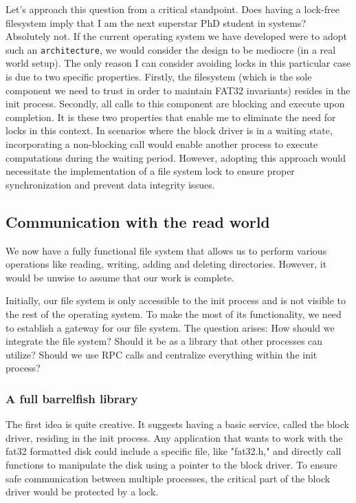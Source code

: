 {Let's approach this question from a critical standpoint. Does having a lock-free filesystem imply that I am the next superstar PhD student in systems? Absolutely not. If the current operating system we have developed were to adopt such an \texttt{architecture}, we would consider the design to be mediocre (in a real world setup). The only reason I can consider avoiding locks in this particular case is due to two specific properties. Firstly, the filesystem (which is the sole component we need to trust in order to maintain FAT32 invariants) resides in the init process. Secondly, all calls to this component are blocking and execute upon completion. It is these two properties that enable me to eliminate the need for locks in this context. In scenarios where the block driver is in a waiting state, incorporating a non-blocking call would enable another process to execute computations during the waiting period. However, adopting this approach would necessitate the implementation of a file system lock to ensure proper synchronization and prevent data integrity issues. 
\subsection{Communication with the read world}

We now have a fully functional file system that allows us to perform various operations like reading, writing, adding and deleting directories. However, it would be unwise to assume that our work is complete.

Initially, our file system is only accessible to the init process and is not visible to the rest of the operating system. To make the most of its functionality, we need to establish a gateway for our file system. The question arises: How should we integrate the file system? Should it be as a library that other processes can utilize? Should we use RPC calls and centralize everything within the init process?

\subsubsection{A full barrelfish library}

The first idea is quite creative. It suggests having a basic service, called the block driver, residing in the init process. Any application that wants to work with the fat32 formatted disk could include a specific file, like "fat32.h," and directly call functions to manipulate the disk using a pointer to the block driver. To ensure safe communication between multiple processes, the critical part of the block driver would be protected by a lock.

}

